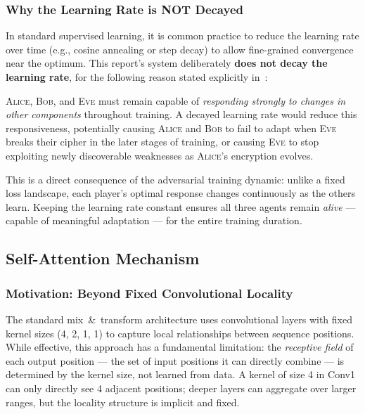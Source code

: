 \documentclass[12pt, a4paper]{article}
\newcommand{\alice}{\textsc{Alice}}
\newcommand{\bob}{\textsc{Bob}}
\newcommand{\eve}{\textsc{Eve}}
\begin{document}
\subsubsection*{Why the Learning Rate is NOT Decayed}

In standard supervised learning, it is common practice to reduce the
learning rate over time (e.g., cosine annealing or step decay) to
allow fine-grained convergence near the optimum. This report's system
deliberately \textbf{does not decay the learning rate}, for the
following reason stated explicitly in~\cite{abadi2016learning}:

\begin{tcolorbox}[contribbox, title={Design Rationale: No Learning Rate Decay}]
  \alice{}, \bob{}, and \eve{} must remain capable of \emph{responding
  strongly to changes in other components} throughout training. A decayed
  learning rate would reduce this responsiveness, potentially causing
  \alice{} and \bob{} to fail to adapt when \eve{} breaks their cipher
  in the later stages of training, or causing \eve{} to stop exploiting
  newly discoverable weaknesses as \alice{}'s encryption evolves.
\end{tcolorbox}

\noindent This is a direct consequence of the adversarial training
dynamic: unlike a fixed loss landscape, each player's optimal response
changes continuously as the others learn. Keeping the learning rate
constant ensures all three agents remain \emph{alive} — capable of
meaningful adaptation — for the entire training duration.

\subsection{Self-Attention Mechanism}
\label{subsec:attention}

\subsubsection*{Motivation: Beyond Fixed Convolutional Locality}

The standard mix~\&~transform architecture uses convolutional layers with
fixed kernel sizes (4, 2, 1, 1) to capture local relationships between
sequence positions. While effective, this approach has a fundamental
limitation: the \emph{receptive field} of each output position — the
set of input positions it can directly combine — is determined by the
kernel size, not learned from data. A kernel of size 4 in Conv1 can
only directly see 4 adjacent positions; deeper layers can aggregate over
larger ranges, but the locality structure is implicit and fixed.
\end{document}
